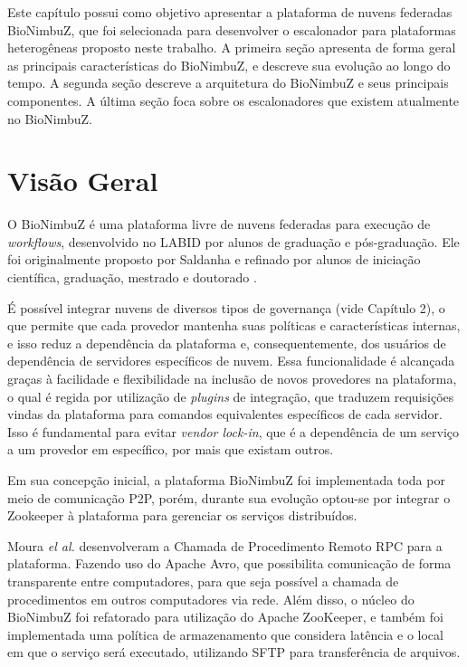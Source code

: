 Este capítulo possui como objetivo apresentar a plataforma de nuvens federadas BioNimbuZ, que foi selecionada para desenvolver o escalonador para plataformas heterogêneas proposto neste trabalho. A primeira seção apresenta de forma geral as principais características do BioNimbuZ, e descreve sua evolução ao longo do tempo. A segunda seção descreve a arquitetura do BioNimbuZ e seus principais componentes. A última seção foca sobre os escalonadores que existem atualmente no BioNimbuZ.

\section{Visão Geral}

O BioNimbuZ é uma plataforma livre de nuvens federadas para execução de \textit{workflows}, desenvolvido no \acrfull{LABID} por alunos de graduação e pós-graduação. Ele foi originalmente proposto por Saldanha\cite{Saldanha_BioNimbus} e refinado por alunos de iniciação científica, graduação, mestrado e doutorado\cite{BioNimbuZ_Breno_Deric} \cite{BioNimbuZ_6846526} \cite{6732620_BioNimbuZ_ACOsched} \cite{BioNimbuZ_Willian_C99} \cite{closer12_BioNimbuZ_AHP} \cite{BioNimbuZ_Vegara}.

É possível integrar nuvens de diversos tipos de governança (vide Capítulo 2), o que permite que cada provedor mantenha suas políticas e características internas, e isso reduz a dependência da plataforma e, consequentemente, dos usuários de dependência de servidores específicos de nuvem. Essa funcionalidade é alcançada graças à facilidade e flexibilidade na inclusão de novos provedores na plataforma, o qual é regida por utilização de \textit{plugins} de integração, que traduzem requisições vindas da plataforma para comandos equivalentes específicos de cada servidor. Isso é fundamental para evitar \textit{vendor lock-in}\cite{VendorLockInDef}, que é a dependência de um serviço a um provedor em específico, por mais que existam outros.

Em sua concepção inicial, a plataforma BioNimbuZ foi implementada toda por meio de comunicação \acrfull{P2P}, porém, durante sua evolução optou-se por integrar o Zookeeper\cite{Zookeeper} à plataforma para gerenciar os serviços distribuídos. %

Moura \textit{el al.}\cite{BioNimbuZ_6846526} desenvolveram a Chamada de Procedimento Remoto \acrshort{RPC}\cite{RPC_1701928} para a plataforma. Fazendo uso do Apache Avro\cite{Avro}, que possibilita comunicação de forma transparente entre computadores, para que seja possível a chamada de procedimentos em outros computadores via rede. Além disso, o núcleo do BioNimbuZ foi refatorado para utilização do Apache ZooKeeper\cite{Zookeeper}, e também foi implementada uma política de armazenamento que considera latência e o local em que o serviço será executado, utilizando \acrfull{SFTP} para transferência de arquivos.


